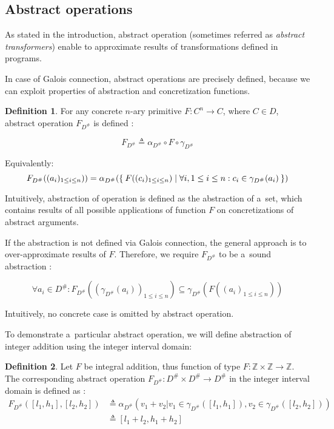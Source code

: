 \documentclass[12pt,oneside]{fithesis2}
\theoremstyle{definition}
\newtheorem{definition}{Definition}
\begin{document}
\subsection{Abstract operations}\label{sec:operations}

As stated in the introduction, abstract operation (sometimes referred as \textit{abstract transformers}) enable to approximate results of transformations defined in programs.

In case of Galois connection, abstract operations are precisely defined, because we can exploit properties of abstraction and concretization functions.

\begin{definition}\label{def:operation-galois}
  For any concrete $n$-ary primitive $F: C^n \to C$, where $C \in D$, abstract operation $F_{D^\#}$ is defined \cite{mine-AIAA10}:

  \[
    F_{D^\#} \triangleq \alpha_{D^\#} \circ F \circ \gamma_{D^\#}
  \]

  Equivalently:
  \[
    F_{D^\#}((a_i)_{1 \le i \le n})) =  \alpha_{D^\#}(\Set{F((c_i)_{1 \le i \le n}) | \forall i, 1 \le i \le n: c_i \in \gamma_{D^\#}(a_i)})
  \]
\end{definition}

Intuitively, abstraction of operation is defined as the abstraction of a~set, which contains results of all possible applications of function $F$ on concretizations of abstract arguments.

If the abstraction is not defined via Galois connection, the general approach is to over-approximate results of $F$. Therefore, we require $F_{D^\#}$ to be a~sound abstraction \cite{CousotEtAl06-ASIAN}:

\[
  \forall a_i \in D^\#: F_{D^\#}((\gamma_{D^\#}(a_i))_{1 \le i \le n}) \subseteq \gamma_{D^\#}(F((a_i)_{1 \le i \le n}))
\]

Intuitively, no concrete case is omitted by abstract operation.

To demonstrate a~particular abstract operation, we will define abstraction of integer addition using the integer interval domain:

\begin{definition}
  Let $F$ be integral addition, thus function of type $F: \mathbb Z \times \mathbb Z \to \mathbb Z$. The corresponding abstract operation $F_{D^\#}: D^\# \times D^\# \to D^\#$ in the integer interval domain is defined as \cite{mine-WING12}:
  \begin{align*}
    F_{D^\#}([l_1, h_1], [l_2, h_2]) &\triangleq \alpha_{D^\#}\left( v_1 + v_2 | v_1 \in \gamma_{D^\#}([l_1, h_1]), v_2 \in \gamma_{D^\#}([l_2, h_2]) \right)\\
    &\triangleq [l_1 + l_2, h_1 + h_2]
  \end{align*}
\end{definition}
\end{document}
